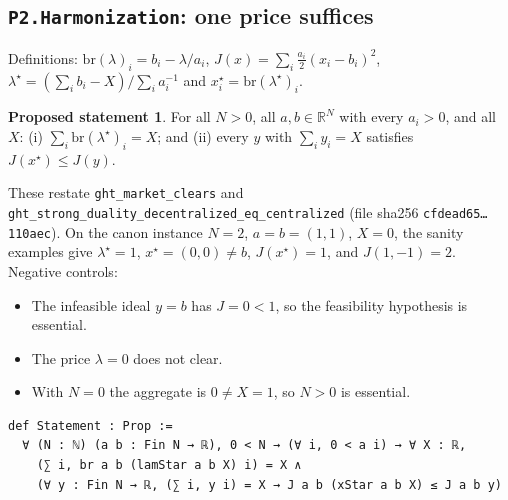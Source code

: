 \documentclass[11pt]{article}
\theoremstyle{definition}
\newtheorem{proposal}[theorem]{Proposed statement}
\theoremstyle{remark}
\begin{document}
\subsection{\texttt{P2.Harmonization}: one price suffices}
Definitions: $\mathrm{br}(\lambda)_i=b_i-\lambda/a_i$, $J(x)=\sum_i \tfrac{a_i}{2}(x_i-b_i)^2$,
$\lambda^\star=(\sum_i b_i-X)/\sum_i a_i^{-1}$ and $x^\star_i=\mathrm{br}(\lambda^\star)_i$.
\begin{proposal}
For all $N>0$, all $a,b\in\mathbb{R}^N$ with every $a_i>0$, and all $X$:
(i) $\sum_i \mathrm{br}(\lambda^\star)_i=X$; and
(ii) every $y$ with $\sum_i y_i=X$ satisfies $J(x^\star)\le J(y)$.
\end{proposal}
These restate \texttt{ght\_market\_clears} and \texttt{ght\_strong\_duality\_decentralized\_eq\_centralized}
(file sha256 \texttt{cfdead65\ldots 110aec}).
On the canon instance $N=2$, $a=b=(1,1)$, $X=0$, the sanity examples give $\lambda^\star=1$, $x^\star=(0,0)\ne b$, $J(x^\star)=1$, and $J(1,-1)=2$.
Negative controls:
\begin{itemize}
\item The infeasible ideal $y=b$ has $J=0<1$, so the feasibility hypothesis is essential.
\item The price $\lambda=0$ does not clear.
\item With $N=0$ the aggregate is $0\ne X=1$, so $N>0$ is essential.
\end{itemize}
\begin{lstlisting}
def Statement : Prop :=
  ∀ (N : ℕ) (a b : Fin N → ℝ), 0 < N → (∀ i, 0 < a i) → ∀ X : ℝ,
    (∑ i, br a b (lamStar a b X) i) = X ∧
    (∀ y : Fin N → ℝ, (∑ i, y i) = X → J a b (xStar a b X) ≤ J a b y)
\end{lstlisting}
\end{document}

